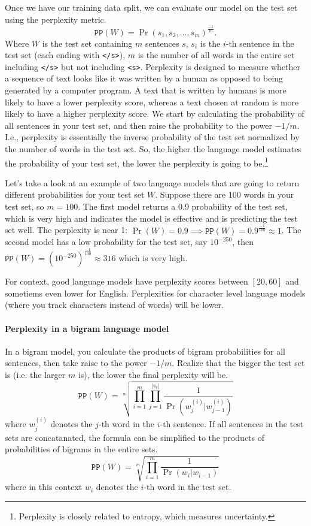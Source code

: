 \documentclass[12pt]{article}
\begin{document}
Once we have our training data split, we can evaluate our model on the test set using the perplexity metric.
\[
  \texttt{PP}(W) = \Pr(s_1, s_2, \ldots, s_m)^{\frac{-1}{m}}.
\]
Where $W$ is the test set containing $m$ sentences $s$, $s_i$ is the $i$-th sentence in the test set (each ending with \texttt{</s>}), $m$ is the number of all words in the entire set including \texttt{</s>} but not including \texttt{<s>}. Perplexity is designed to measure whether a sequence of text looks like it was written by a human as opposed to being generated by a computer program. A text that is written by humans is more likely to have a lower perplexity score, whereas a text chosen at random is more likely to have a higher perplexity score. We start by calculating the probability of all sentences in your test set, and then raise the probability to the power $-1/m$. I.e., perplexity is essentially the inverse probability of the test set normalized by the number of words in the test set. So, the higher the language model estimates the probability of your test set, the lower the perplexity is going to be.\footnote{Perplexity is closely related to entropy, which measures   uncertainty.}

Let's take a look at an example of two language models that are going to return different probabilities for your test set $W$. Suppose there are 100 words in your test set, so $m = 100$. The first model returns a 0.9 probability of the test set, which is very high and indicates the model is effective and is predicting the test set well. The perplexity is near 1: $\Pr(W) = 0.9 \implies \texttt{PP}(W) = 0.9^{\frac{-1}{100}} \approx 1$. The second model has a low probability for the test set, say $10^{-250}$, then $\texttt{PP}(W) = (10^{-250})^{\frac{-1}{100}} \approx 316$ which is very high.

For context, good language models have perplexity scores between $[20, 60]$ and sometiems even lower for English. Perplexities for character level language models (where you track characters instead of words) will be lower.

\paragraph{Perplexity in a bigram language model} In a bigram model, you calculate the products of bigram probabilities for all sentences, then take raise to the power $-1/m$. Realize that the bigger the test set is (i.e. the larger $m$ is), the lower the final perplexity will be. 
\[
  \texttt{PP}(W) = \sqrt[m]{\prod_{i=1}^{m} \prod_{j=1}^{|s_i|} \frac{1}{\Pr(w_j^{(i)} | w_{j-1}^{(i)})}}
\]
where $w_j^{(i)}$ denotes the $j$-th word in the $i$-th sentence.
If all sentences in the test sets are concatanated, the formula can be simplified to the products of probabilities of bigrams in the entire sets.
\[
  \texttt{PP}(W) = \sqrt[m]{\prod_{i=1}^{m} \frac{1}{\Pr(w_i | w_{i-1})}}
\]
where in this context $w_i$ denotes the $i$-th word in the test set.
\end{document}
